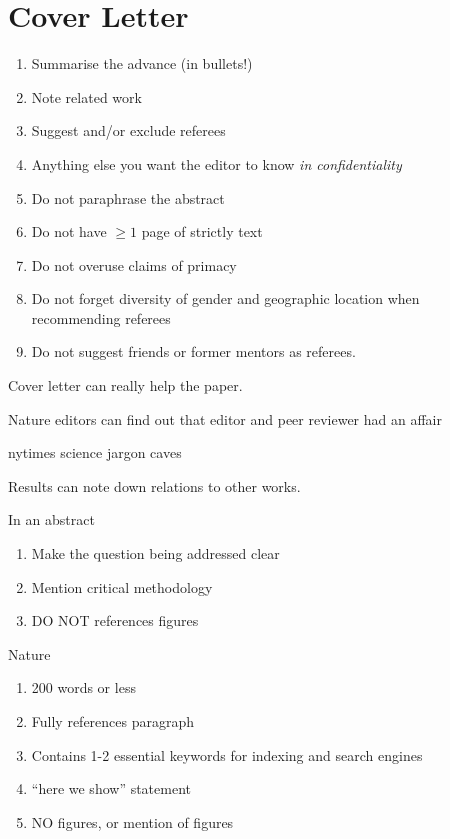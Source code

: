 \documentclass[prb,12pt]{revtex4-2}
\theoremstyle{definition}
\theoremstyle{definition}
\begin{document}
\section{Cover Letter}
\begin{enumerate}
	\item Summarise the advance (in bullets!)
	\item Note related work
	\item Suggest and/or exclude referees
	\item Anything else you want the editor to know \emph{in confidentiality}
	\item Do not paraphrase the abstract
	\item Do not have $\ge 1$ page of strictly text
	\item Do not overuse claims of primacy
	\item Do not forget diversity of gender and geographic location when recommending referees
	\item Do not suggest friends or former mentors as referees.
\end{enumerate}

Cover letter can really help the paper.

Nature editors can find out that editor and peer reviewer had an affair

nytimes science jargon caves

Results can note down relations to other works.

In an abstract
\begin{enumerate}
	\item Make the question being addressed clear
	\item Mention critical methodology
	\item DO NOT references figures
\end{enumerate}

Nature
\begin{enumerate}
	\item 200 words or less
	\item Fully references paragraph
	\item Contains 1-2 essential keywords for indexing and search engines
	\item ``here we show'' statement
	\item NO figures, or mention of figures
\end{enumerate}
\end{document}
